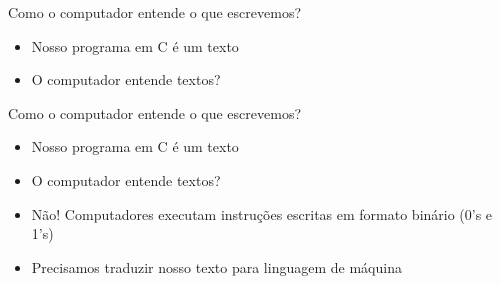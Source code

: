 \documentclass[t, aspectratio=169]{beamer}
\begin{document}
\begin{frame}[label={sec:org74c1e94}]{Como o computador entende o que escrevemos?}
\begin{itemize}
\item Nosso programa em C é um texto
\item O computador entende textos?
\end{itemize}
\end{frame}

\begin{frame}[label={sec:org04961d4}]{Como o computador entende o que escrevemos?}
\begin{itemize}
\item Nosso programa em C é um texto
\item O computador entende textos?
\item \alert{Não!} Computadores executam instruções escritas em formato binário (0's e 1's)
\item Precisamos traduzir nosso texto para \alert{linguagem de máquina}
\end{itemize}
\end{frame}
\end{document}
